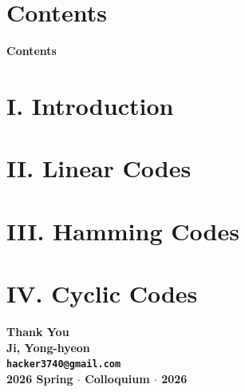 \documentclass[10pt,aspectratio=1610,compress,dvipsnames]{beamer}
\begin{document}
\begin{frame}
  \titlepage
\end{frame}

\section*{Contents}
\begin{frame}{\textbf{Contents}}
  \tableofcontents
\end{frame}

\section{I. Introduction}


\section{II. Linear Codes}


\section{III. Hamming Codes}


\section{IV. Cyclic Codes}


\begin{frame}[plain]
  \begin{center}\bfseries\centering
    \vspace{2cm}
    {\Huge\color{TealDarkCyan} Thank You}\\[.5cm]
    {\large\color{black} Ji, Yong-hyeon}\\[.3cm]
    {\normalsize\texttt{hacker3740@gmail.com}}\\[.5cm]
    {\small\color{gray} 2026 Spring $\cdot$ Colloquium $\cdot$ 2026}
    \bigskip
  \end{center}
\end{frame}
\end{document}
